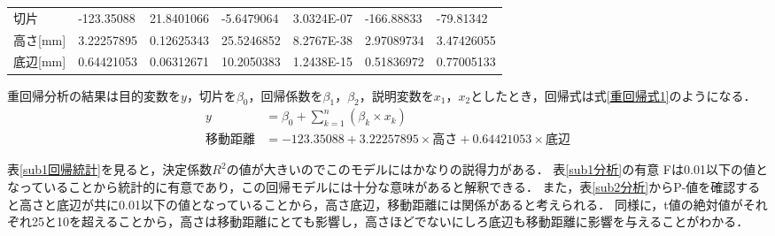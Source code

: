 \documentclass[titlepage,a4paper]{jsarticle}
\begin{document}
\begin{table}[H]
\begin{minipage}[c]{1\hsize}
\begin{tabular}{l|llllll}
      切片                    & -123.35088             & 21.8401066               & -5.6479064             & 3.0324E-07              & -166.88833                  & -79.81342                   \\
      高さ{[}mm{]}            & 3.22257895             & 0.12625343               & 25.5246852             & 8.2767E-38              & 2.97089734                  & 3.47426055                  \\
      底辺{[}mm{]}            & 0.64421053             & 0.06312671               & 10.2050383             & 1.2438E-15              & 0.51836972                  & 0.77005133                  \\\hline
    \end{tabular}
  \end{minipage}
\end{table}

重回帰分析の結果は目的変数を$y$，切片を$\beta_{0}$，回帰係数を$\beta_{1}$，$\beta_{2}$，説明変数を$x_{1}$，$x_{2}$としたとき，回帰式は式\eqref{重回帰式1}のようになる．
\begin{align}
  y    & = \beta_{0}+\sum_{k=1}^{n}\left(\beta_{k} \times x_{k}\right)            \\
  移動距離 & = -123.35088 + 3.22257895  \times 高さ+ 0.64421053 \times 底辺 \label{重回帰式1}
\end{align}

表\ref{sub1回帰統計}を見ると，決定係数$R^{2}$の値が大きいのでこのモデルにはかなりの説得力がある．
表\ref{sub1分析}の有意 Fは0.01以下の値となっていることから統計的に有意であり，この回帰モデルには十分な意味があると解釈できる．
また，表\ref{sub2分析}からP-値を確認すると高さと底辺が共に0.01以下の値となっていることから，高さ底辺，移動距離には関係があると考えられる．
同様に，t値の絶対値がそれぞれ25と10を超えることから，高さは移動距離にとても影響し，高さほどでないにしろ底辺も移動距離に影響を与えることがわかる．
\end{document}
